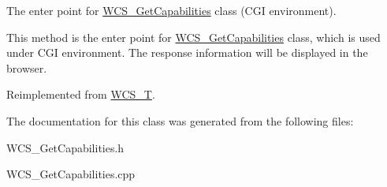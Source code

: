 The enter point for \hyperlink{classWCS__GetCapabilities}{WCS\_\-GetCapabilities} class (CGI environment). 

This method is the enter point for \hyperlink{classWCS__GetCapabilities}{WCS\_\-GetCapabilities} class, which is used under CGI environment. The response information will be displayed in the browser. 

Reimplemented from \hyperlink{classWCS__T}{WCS\_\-T}.



The documentation for this class was generated from the following files:\begin{DoxyCompactItemize}
\item 
WCS\_\-GetCapabilities.h\item 
WCS\_\-GetCapabilities.cpp\end{DoxyCompactItemize}
